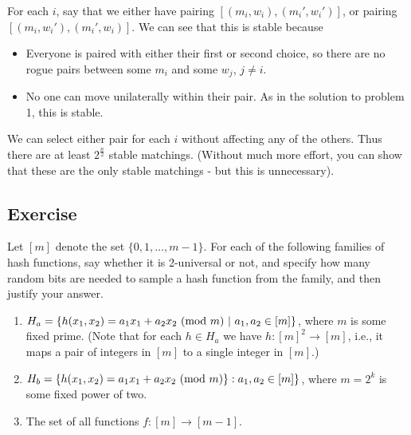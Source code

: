 \documentclass{article}
\newcounter{counter}
\newcommand{\Exercise}{Exercise \stepcounter{counter}\thecounter}
\begin{document}
\begin{itemize}
        For each $i$, say that we either have pairing $[(m_i,w_i), (m_i',w_i')]$,
        or pairing $[(m_i, w_i'),(m_i',w_i)]$. 
        We can see that this is stable because 
        \begin{itemize}
          \item Everyone is paired with either their first or second choice, so
            there are no rogue pairs between some $m_i$ and some $w_j$, $j\neq i$.
          \item No one can move unilaterally within their pair. As in the solution
            to problem 1, this is stable.
        \end{itemize}
    
        We can select either pair for each $i$ without affecting any of the
        others. Thus there are at least $2^{\frac{n}{2}}$ stable matchings.
        (Without much more effort, you can show that these are the only stable
        matchings - but this is unnecessary).
    \end{itemize}

\subsection*{\Exercise}
    Let $[m]$ denote the set $\{0,1,\dots, m-1\}$.  For each of the following families of hash functions, say whether it is 2-universal or not, and specify how many random bits are needed to sample a hash function from the family, and then justify your answer.
    \begin{enumerate}
        \item $H_a = \{h(x_1,x_2)=a_1 x_1 + a_2 x_2 \ ({\rm mod} \ m) \ | \ a_1, a_2 \in [m]\}$, where $m$ is some fixed prime.  (Note that for each $h\in H_a$ we have $h: [m]^2 \rightarrow [m]$, i.e., it maps a pair of integers in $[m]$ to a single integer in $[m]$.)
        \item $H_b = \{h(x_1,x_2) = a_1x_1 + a_2 x_2 \ ({\rm mod} \  m) \} : a_1, a_2 \in [m]\}$, where $m=2^k$ is some fixed power of two.
        \item The set of all functions $f: [m]\rightarrow [m-1]$.
    \end{enumerate}
\end{document}
